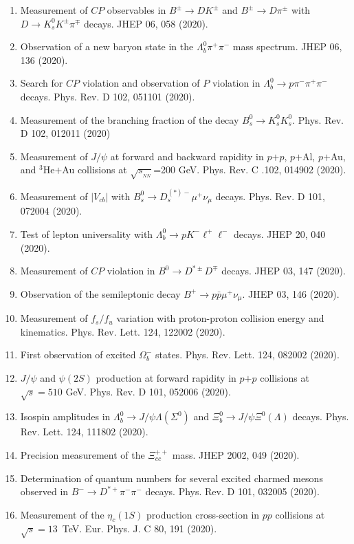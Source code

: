 \documentclass[11pt]{article}
\newcommand{\snn}{\sqrt{s_{_{NN}}}}
\begin{document}
\begin{flushleft}
\begin{center}
\begin{enumerate}
		\item Measurement of $CP$ observables in $B^\pm\rightarrow DK^\pm$ and $B^\pm\rightarrow D\pi^\pm$ with $D\rightarrow K_s^0K^\pm\pi^\mp$ decays. JHEP 06, 058 (2020).
		\item Observation of a new baryon state in the $\Lambda_b^0\pi^+\pi^-$ mass spectrum. JHEP 06, 136 (2020).
		\item Search for $CP$ violation and observation of $P$ violation in $\Lambda_b^0\rightarrow p\pi^-\pi^+\pi^-$ decays. Phys. Rev. D 102, 051101 (2020).
		\item Measurement of the branching fraction of the decay $B_s^0\rightarrow K_s^0K_s^0$. Phys. Rev. D 102, 012011 (2020)
		\item Measurement of $J/\psi$ at forward and backward rapidity in $p$$+$$p$, $p$$+$Al, $p$$+$Au, and $^3$He$+$Au collisions at $\snn$=200 GeV. Phys. Rev. C .102, 014902 (2020).
		\item Measurement of $|V_{cb}|$ with $B_s^0\rightarrow D_s^{(*)-}\mu^+\nu_\mu$ decays. Phys. Rev. D 101, 072004 (2020).
	\item Test of lepton universality with $\Lambda_b^0\rightarrow pK^-\ell^+\ell^-$ decays. JHEP 20, 040 (2020).
			\item Measurement of $CP$ violation in $B^0\rightarrow D^{*\pm}D^\mp$ decays. JHEP 03, 147 (2020).
		\item Observation of the semileptonic decay $B^+\rightarrow p\bar{p}\mu^+\nu_{\mu}$. JHEP 03, 146 (2020).
		\item Measurement of $f_s/f_u$ variation with proton-proton collision energy and kinematics. Phys. Rev. Lett. 124, 122002 (2020).
		\item First observation of excited $\Omega_b^-$ states. Phys. Rev. Lett. 124, 082002 (2020).
		\item $J/\psi$ and $\psi(2S)$ production at forward rapidity in $p$$+$$p$ collisions at $\sqrt{s}=510$ GeV. Phys. Rev. D 101, 052006 (2020).
		\item Isospin amplitudes in $\Lambda_{b}^0\rightarrow J/\psi\Lambda(\Sigma^0)$ and $\Xi_b^0\rightarrow J/\psi\Xi^0(\Lambda)$ decays. Phys. Rev. Lett. 124, 111802 (2020).
	 	\item Precision measurement of the $\Xi_{cc}^{++}$ mass. JHEP 2002, 049 (2020).
		\item Determination of quantum numbers for several excited charmed mesons observed in $B^-\rightarrow D^{*+}\pi^-\pi^-$  decays. Phys. Rev. D 101, 032005 (2020).
		\item Measurement of the $\eta_c(1S)$ production cross-section in $pp$ collisions at $\sqrt{s}=13$~TeV. Eur. Phys. J. C 80, 191 (2020).

\end{enumerate}
\end{center}
\end{flushleft}
\end{document}
